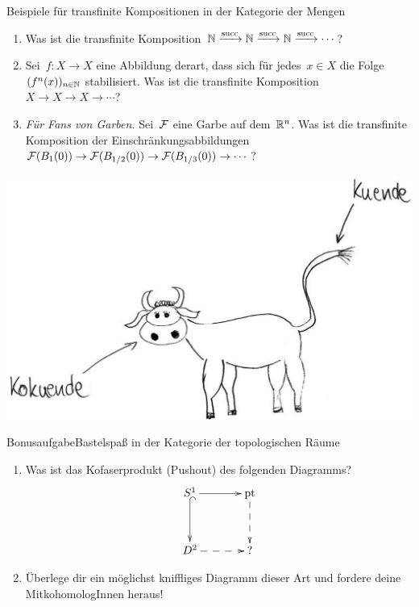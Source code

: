 \documentclass{uebblatt}
\newcommand{\sukk}{\mathrm{succ}}
\begin{document}
\begin{aufgabe}{Beispiele für transfinite Kompositionen in der Kategorie der Mengen}
\begin{enumerate}
\item Was ist die transfinite Komposition~$\NN \xra{\sukk} \NN \xra{\sukk} \NN
\xra{\sukk} \cdots$?
\item Sei~$f : X \to X$ eine Abbildung derart, dass sich für jedes~$x \in X$
die Folge~$(f^n(x))_{n \in \mathbb{N}}$ stabilisiert. Was ist die transfinite
Komposition~$X \to X \to X \to \cdots$?
\item \emph{Für Fans von Garben.} Sei~$\mathcal{F}$ eine Garbe auf dem~$\mathbb{R}^n$. Was ist
die transfinite Komposition der Einschränkungsabbildungen~$\mathcal{F}(B_1(0)) \to
\mathcal{F}(B_{1/2}(0)) \to \mathcal{F}(B_{1/3}(0)) \to \cdots$?
\end{enumerate}
\end{aufgabe}

{\centering
\includegraphics[scale=0.6]{images/kuende}
\par}

\newpage

\begin{aufgabe*}{Bonusaufgabe}{Bastelspaß in der Kategorie der topologischen Räume}
\begin{enumerate}
\item Was ist das Kofaserprodukt (Pushout) des folgenden Diagramms?
\[ \xymatrixcolsep{3pc}\xymatrixrowsep{3pc}\xymatrix{
  S^1 \ar[r] \ar@{^{(}->}[d] & \mathrm{pt} \ar@{-->}[d] \\
  D^2 \ar@{-->}[r] & ?
} \]
\item Überlege dir ein möglichst kniffliges Diagramm dieser Art und fordere
deine MitkohomologInnen heraus!
\end{enumerate}
\end{aufgabe*}
\end{document}
